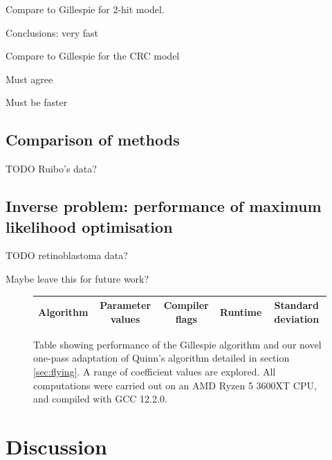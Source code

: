 \documentclass{article}
\begin{document}
Compare to Gillespie for 2-hit model.

  Conclusions: very fast

Compare to Gillespie for the CRC model

  Must agree

  Must be faster

%

\subsection{Comparison of methods}

TODO Ruibo's data?

\subsection{Inverse problem: performance of maximum likelihood optimisation}

TODO retinoblastoma data?

Maybe leave this for future work?

\begin{figure}
\begin{tabular}{|c|c|c|c|c|}
\hline
Algorithm & Parameter values & Compiler flags & Runtime & Standard deviation \\
\hline
\end{tabular}
\caption{Table showing performance of the Gillespie algorithm and our novel
one-pass adaptation of Quinn's algorithm detailed in section \ref{sec:flying}. A
range of coefficient values are explored. All computations were carried out on
an AMD Ryzen 5 3600XT CPU, and compiled with GCC 12.2.0.}
\end{figure}

\section{Discussion}

\end{document}
